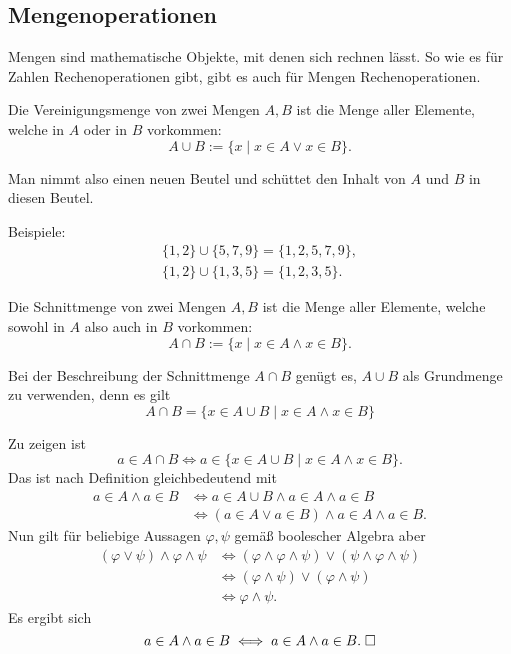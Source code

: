 \newpage
\subsection{Mengenoperationen}

Mengen sind mathematische Objekte, mit denen sich rechnen lässt.
So wie es für Zahlen Rechenoperationen gibt, gibt es auch für
Mengen Rechenoperationen.
\begin{Definition}[Vereinigungsmenge]
Die Vereinigungsmenge von zwei Mengen $A,B$ ist die Menge aller Elemente,
welche in $A$ oder in $B$ vorkommen:
\[A\cup B := \{x\mid x\in A\lor x\in B\}.\]
\end{Definition}
Man nimmt also einen neuen Beutel und schüttet den Inhalt von $A$
und $B$ in diesen Beutel.

Beispiele:
\begin{gather*}
\{1,2\}\cup\{5,7,9\} = \{1,2,5,7,9\},\\
\{1,2\}\cup\{1,3,5\} = \{1,2,3,5\}.
\end{gather*}

\begin{Definition}[Schnittmenge]
Die Schnittmenge von zwei Mengen $A,B$ ist die Menge aller Elemente,
welche sowohl in $A$ also auch in $B$ vorkommen:
\[A\cap B := \{x\mid x\in A\land x\in B\}.\]
\end{Definition}
\begin{Satz}
Bei der Beschreibung der Schnittmenge $A\cap B$ genügt es, $A\cup B$ als Grundmenge
zu verwenden, denn es gilt
\[A\cap B = \{x\in A\cup B\mid x\in A\land x\in B\}\]
\end{Satz}
Zu zeigen ist
\[a\in A\cap B\iff a\in \{x\in A\cup B\mid x\in A\land x\in B\}.\]
Das ist nach Definition gleichbedeutend mit
\begin{align*}
a\in A\land a\in B&\iff a\in A\cup B\land a\in A\land a\in B\\
&\iff (a\in A\lor a\in B)\land a\in A\land a\in B.
\end{align*}
Nun gilt für beliebige Aussagen $\varphi,\psi$ gemäß boolescher Algebra aber
\begin{align*}
(\varphi\lor\psi)\land\varphi\land\psi
&\iff (\varphi\land\varphi\land\psi)\lor(\psi\land\varphi\land\psi)\\
&\iff (\varphi\land\psi)\lor(\varphi\land\psi)\\
&\iff \varphi\land\psi.
\end{align*}
Es ergibt sich
\[a\in A\land a\in B\iff a\in A\land a\in B.\;\Box\]

